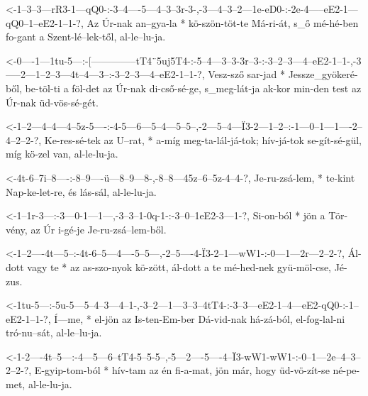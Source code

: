   {<-1--3--3---rR3-1---qQ0-:-3--4----5---4--3--3r-3-,-3---4--3--2---1e-eD0-:-2e-4-----eE2-1---qQ0--1--eE2-1--1-?,}
  {  Az Úr-nak an--gya-la  * kö-szön-töt-te Má-ri-át, s_ő mé-hé-ben fo-gant  a  Szent-lé--lek-től, al-le--lu-ja.}


  {<-0----1---1tu-5---:-[--------------tT4¨5uj5T4-:-5--4---3--3-3r--3-:-3--2--3---4--eE2-1--1-,-3-----2---1--2--3---4t--4---3--:-3--2--3---4--eE2-1--1-?,}
  {  Vesz-sző sar-jad * Jessze_gyökeré-ből,         be-töl-ti a föl-det az Úr-nak di-cső-sé-ge, s_meg-lát-ja ak-kor min-den test az Úr-nak üd-vös-sé-gét.}

  {<-1--2---4--4---4--5z-5----:-4-5---6---5--4---5--5--,-2---5--4---Ï3-2---1--2--:-1---0--1---1----2--4--2--2-?,}
  {  Ke-res-sé-tek az U--rat, * a-míg meg-ta-lál-já-tok; hív-já-tok se-gít-sé-gül, míg kö-zel van, al-le-lu-ja.}


  {<-4t-6--7i--8----:-8--9----ü---8--9---8-,-8--8---45z--6--5z-4--4-?,}
  {  Je-ru-zsá-lem, * te-kint Nap-ke-let-re, és lás-sál, al-le-lu-ja.}

  {<-1--1r-3---:-3---0-1---1---,-3--3--1-0q-1-:-3--0--1eE2-3---1-?,}
  {  Si-on-ból * jön a Tör-vény, az Úr i-gé-je  Je-ru-zsá--lem-ből.}


  {<-1--2----4t---5--:-4t-6--5---4----5--5---,-2--5----4-Ï3-2--1---wW1-:-0---1---2r---2--2-?,}
  {  Ál-dott vagy te * az as-szo-nyok kö-zött, ál-dott a te mé-hed-nek   gyü-möl-cse, Jé-zus.}


  {<-1tu-5---:-5u-5---5--4--3---4--1-,-3--2---1---3--3--4tT4-:-3--3---eE2-1--4---eE2-qQ0-:-1--eE2-1--1-?,}
  {  Í---me, * el-jön az Is-ten-Em-ber Dá-vid-nak há-zá-ból,   el-fog-lal-ni tró-nu--sát,  al-le--lu-ja.}

  {<-1-2----4t--5---:-4---5---6--tT4-5--5-5--,-5---2----5----4--Ï3-wW1-wW1-:-0--1--–2e--4--3--2--2-?,}
  {  E-gyip-tom-ból * hív-tam az én  fi-a-mat, jön már, hogy üd-vö-zít-se    né-pe-met, al-le-lu-ja.}


